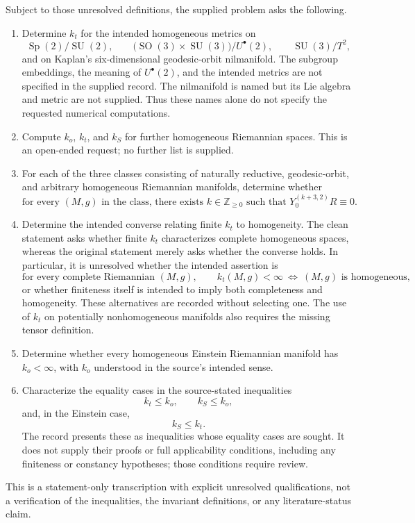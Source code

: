 \documentclass[11pt]{article}
\newcommand{\Z}{\mathbb{Z}}
\begin{document}
Subject to those unresolved definitions, the supplied problem asks the following.
\begin{enumerate}
\item Determine \(k_t\) for the intended homogeneous metrics on
\[
 \operatorname{Sp}(2)/\operatorname{SU}(2),\qquad
 \bigl(\operatorname{SO}(3)\times\operatorname{SU}(3)\bigr)/U^\bullet(2),\qquad
 \operatorname{SU}(3)/T^2,
\]
and on Kaplan's six-dimensional geodesic-orbit nilmanifold. The subgroup embeddings, the meaning of \(U^\bullet(2)\), and the intended metrics are not specified in the supplied record. The nilmanifold is named but its Lie algebra and metric are not supplied. Thus these names alone do not specify the requested numerical computations.
\item Compute \(k_o\), \(k_t\), and \(k_S\) for further homogeneous Riemannian spaces. This is an open-ended request; no further list is supplied.
\item For each of the three classes consisting of naturally reductive, geodesic-orbit, and arbitrary homogeneous Riemannian manifolds, determine whether
\[
 \text{for every }(M,g)\text{ in the class, there exists }k\in\Z_{\geq0}
 \text{ such that }Y_0^{(k+3,2)}R\equiv0.
\]
\item Determine the intended converse relating finite \(k_t\) to homogeneity. The clean statement asks whether finite \(k_t\) characterizes complete homogeneous spaces, whereas the original statement merely asks whether the converse holds. In particular, it is unresolved whether the intended assertion is
\[
 \text{for every complete Riemannian }(M,g),\qquad
 k_t(M,g)<\infty\ \Longleftrightarrow\ (M,g)\text{ is homogeneous},
\]
or whether finiteness itself is intended to imply both completeness and homogeneity. These alternatives are recorded without selecting one. The use of \(k_t\) on potentially nonhomogeneous manifolds also requires the missing tensor definition.
\item Determine whether every homogeneous Einstein Riemannian manifold has \(k_o<\infty\), with \(k_o\) understood in the source's intended sense.
\item Characterize the equality cases in the source-stated inequalities
\[
 k_t\leq k_o,\qquad k_S\leq k_o,
\]
and, in the Einstein case,
\[
 k_S\leq k_t.
\]
The record presents these as inequalities whose equality cases are sought. It does not supply their proofs or full applicability conditions, including any finiteness or constancy hypotheses; those conditions require review.
\end{enumerate}
This is a statement-only transcription with explicit unresolved qualifications, not a verification of the inequalities, the invariant definitions, or any literature-status claim.
\end{document}

